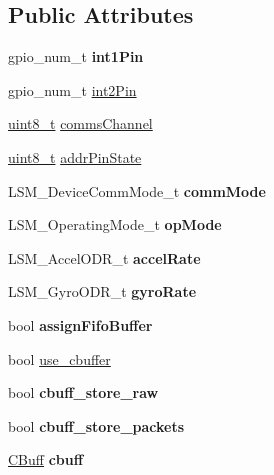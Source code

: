 \subsection*{Public Attributes}
\begin{DoxyCompactItemize}
\item 
\mbox{\label{structLSM__initData_a93ccee9247696ea65763e54a95352894}} 
gpio\+\_\+num\+\_\+t {\bfseries int1\+Pin}
\item 
gpio\+\_\+num\+\_\+t \hyperlink{structLSM__initData_a835c4e1a7a48cd95ef86123477e172d3}{int2\+Pin}
\item 
\hyperlink{vl53l0x__types_8h_aba7bc1797add20fe3efdf37ced1182c5}{uint8\+\_\+t} \hyperlink{structLSM__initData_a9742f792882a0ed6f85898600cf923b2}{comms\+Channel}
\item 
\hyperlink{vl53l0x__types_8h_aba7bc1797add20fe3efdf37ced1182c5}{uint8\+\_\+t} \hyperlink{structLSM__initData_a53b58c95bfcef402318923290252796a}{addr\+Pin\+State}
\item 
\mbox{\label{structLSM__initData_ae12da731369c6ae103cf2c5cdd002989}} 
L\+S\+M\+\_\+\+Device\+Comm\+Mode\+\_\+t {\bfseries comm\+Mode}
\item 
\mbox{\label{structLSM__initData_a6e8a8c3e3ad8b92763e16e32942e86fc}} 
L\+S\+M\+\_\+\+Operating\+Mode\+\_\+t {\bfseries op\+Mode}
\item 
\mbox{\label{structLSM__initData_a303233d88db4314a2d773dae4106f8ea}} 
L\+S\+M\+\_\+\+Accel\+O\+D\+R\+\_\+t {\bfseries accel\+Rate}
\item 
\mbox{\label{structLSM__initData_a5b35f43fcd684e7d12ac8513ae92c07e}} 
L\+S\+M\+\_\+\+Gyro\+O\+D\+R\+\_\+t {\bfseries gyro\+Rate}
\item 
\mbox{\label{structLSM__initData_a81089885e0e3137a8e47cfd2d73c1884}} 
bool {\bfseries assign\+Fifo\+Buffer}
\item 
bool \hyperlink{structLSM__initData_a6daa9b9c11602e8b64c4a1f33ab03a2b}{use\+\_\+cbuffer}
\item 
\mbox{\label{structLSM__initData_a86b0f56623fc9536c4776f604aebde6f}} 
bool {\bfseries cbuff\+\_\+store\+\_\+raw}
\item 
\mbox{\label{structLSM__initData_a537f3cd3b8f24fa83f82ed0b2bbb325d}} 
bool {\bfseries cbuff\+\_\+store\+\_\+packets}
\item 
\mbox{\label{structLSM__initData_a5c5aa016c9f1ba95a2a336d96b97b4fd}} 
\hyperlink{structCBuffer__Handle}{C\+Buff} {\bfseries cbuff}
\end{DoxyCompactItemize}


